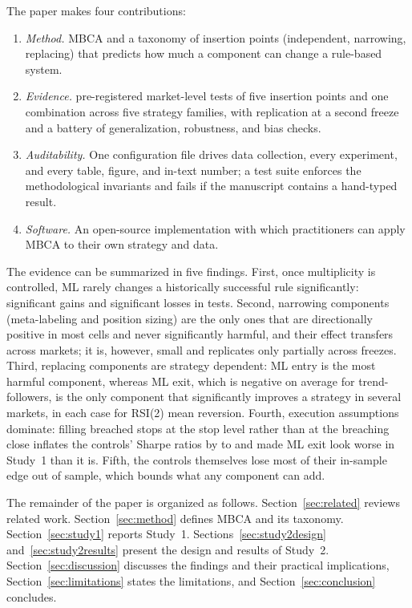 The paper makes four contributions:
\begin{enumerate}
  \item \emph{Method.} MBCA and a taxonomy of insertion points (independent, narrowing, replacing) that predicts how
        much a component can change a rule-based system.
  \item \emph{Evidence.} \STwoMktTests{} pre-registered market-level tests of five insertion points and one
        combination across five strategy families, with replication at a second freeze and a battery of
        generalization, robustness, and bias checks.
  \item \emph{Auditability.} One configuration file drives data collection, every experiment, and every table,
        figure, and in-text number; a test suite enforces the methodological invariants and fails if the manuscript
        contains a hand-typed result.
  \item \emph{Software.} An open-source implementation with which practitioners can apply MBCA to their own strategy
        and data.
\end{enumerate}

The evidence can be summarized in five findings. First, once multiplicity is controlled, ML rarely changes a
historically successful rule significantly: \STwoMktSigGain{} significant gains and \STwoMktSigLoss{} significant
losses in \STwoMktTests{} tests. Second, narrowing components (meta-labeling and position sizing) are the only ones
that are directionally positive in most cells and never significantly harmful, and their effect transfers across
markets; it is, however, small and replicates only partially across freezes. Third, replacing components are strategy
dependent: ML entry is the most harmful component, whereas ML exit, which is negative on average for
trend-followers, is the only component that significantly improves a strategy in several markets, in each case for
RSI(2) mean reversion. Fourth, execution assumptions dominate: filling breached stops at the stop level rather than at
the breaching close inflates the controls' Sharpe ratios by \STwoExecBaseStopMin{} to \STwoExecBaseStopMax{} and made
ML exit look worse in Study~1 than it is. Fifth, the controls themselves lose most of their in-sample edge out of
sample, which bounds what any component can add.

The remainder of the paper is organized as follows. Section~\ref{sec:related} reviews related work.
Section~\ref{sec:method} defines MBCA and its taxonomy. Section~\ref{sec:study1} reports Study~1.
Sections~\ref{sec:study2design} and~\ref{sec:study2results} present the design and results of Study~2.
Section~\ref{sec:discussion} discusses the findings and their practical implications, Section~\ref{sec:limitations}
states the limitations, and Section~\ref{sec:conclusion} concludes.
